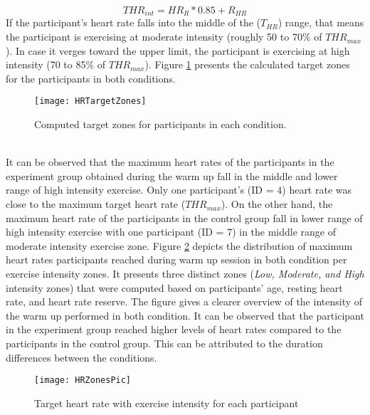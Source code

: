\begin{equation}
THR_{int} =  HR_{R}*0.85 + R_{HR} 
\end{equation} If the participant's heart rate falls into the middle of the (\begin{math} T_{HR}\end{math}) range, that means the participant is exercising at moderate intensity (roughly 50 to 70\% of \begin{math} THR_{max}\end{math}). In case it verges toward the upper limit, the participant is exercising at high intensity (70 to 85\% of \begin{math} THR_{max}\end{math}). Figure \ref{fig:hrZones} presents the calculated target zones for the participants in both conditions.\\
\begin{figure}[h]
    \centering
    \texttt{[image: HRTargetZones]}
    \caption{Computed target zones for participants in each condition.}
    \label{fig:hrZones}
\end{figure}\\
It can be observed that the maximum heart rates of the participants in the experiment group obtained during the warm up fall in the middle and lower range of high intensity exercise. Only one participant's (ID = 4) heart rate was close to the maximum target heart rate (\begin{math} THR_{max}\end{math}). On the other hand, the maximum heart rate of the participants in the control group fall in lower range of high intensity exercise with one participant (ID = 7) in the middle range of moderate intensity exercise zone. Figure \ref{fig:hrzones} depicts the distribution of maximum heart rates participants reached during warm up session in both condition per exercise intensity zones. It presents three distinct zones (\textit{Low, Moderate, and High} intensity zones) that were computed based on participants' age, resting heart rate, and heart rate reserve. The figure gives a clearer overview of the intensity of the warm up performed in both condition. It can be observed that the participant in the experiment group reached higher levels of heart rates compared to the participants in the control group. This can be attributed to the duration differences between the conditions.\pagebreak
\begin{figure}[h]
    \centering
    \texttt{[image: HRZonesPic]}
    \caption{Target heart rate with exercise intensity for each participant}
    \label{fig:hrzones}
\end{figure}\\
